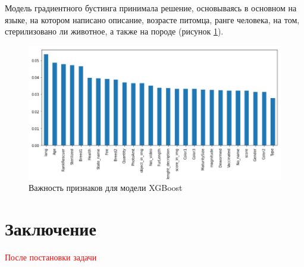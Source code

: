 \documentclass[14pt]{mmcs_article}
\begin{document}
Модель градиентного бустинга принимала решение, основываясь в основном на языке, на котором написано описание, возрасте питомца, ранге человека, на том, стерилизовано ли животное, а также на породе (рисунок \ref{kaggle:boost}).


\begin{figure}[H]
	\centering
	\includegraphics[scale=0.7]{featuresboost.png}
	\caption{Важность признаков для модели XGBoost}\label{kaggle:boost}
\end{figure}


\newpage
{}
\section*{Заключение}

\textcolor{red}{После постановки задачи}



\newpage

\renewcommand{\refname}{\centering \textbf{Литература}}
\end{document}
